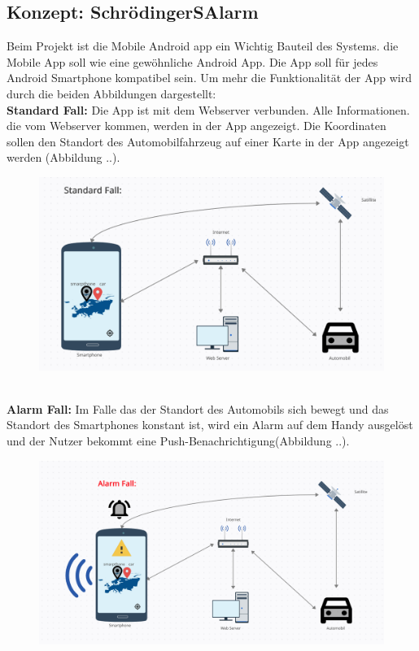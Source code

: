 \subsection{Konzept: SchrödingerSAlarm}
Beim Projekt ist die Mobile Android app ein Wichtig Bauteil des Systems.
die Mobile App soll wie eine gewöhnliche Android App. Die App soll für jedes Android Smartphone kompatibel sein. Um mehr die Funktionalität der App wird durch die beiden Abbildungen dargestellt:\\
\textbf{Standard Fall:} Die App ist mit dem Webserver verbunden. Alle Informationen. die vom Webserver kommen, werden in der App angezeigt. Die Koordinaten sollen den Standort des Automobilfahrzeug auf einer Karte in der App angezeigt werden (Abbildung ..).
\begin{figure}[H]
            \centering
            \includegraphics[width=1\textwidth]{Bilder/StandardFall.PNG}
    \end{figure}
\\\textbf{Alarm Fall:} Im Falle das der Standort des Automobils sich bewegt und das Standort des Smartphones konstant ist, wird ein Alarm auf dem Handy ausgelöst und der Nutzer bekommt eine Push-Benachrichtigung(Abbildung ..).
     \begin{figure}[H]
            \centering
            \includegraphics[width=1\textwidth]{Bilder/AlarmFall.PNG}
    \end{figure}
	
